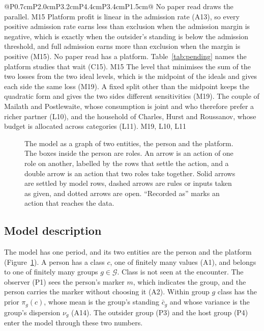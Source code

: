 \begin{longtable}{@{}P{0.7cm}P{2.0cm}P{3.2cm}P{4.4cm}P{3.4cm}P{1.5cm}@{}}
  {No paper read draws the parallel.}
  {M15}
  {Platform profit is linear in the admission rate (A13), so every positive
  admission rate earns less than exclusion when the admission margin is
  negative, which is exactly when the outsider's standing is below the
  admission threshold, and full admission earns more than exclusion when the
  margin is positive (M15).}
  {No paper read has a platform. Table~\ref{tab:pending} names the
  platform studies that wait (C15).}
  {M15}
  {The level that minimises the sum of the two losses from the two ideal
  levels, which is the midpoint of the ideals and gives each side the same
  loss (M19). A fixed split other than the midpoint keeps the quadratic
  form and gives the two sides different sensitivities (M19).}
  {The couple of Mailath and Postlewaite, whose consumption is joint and who
  therefore prefer a richer partner (L10), and the household of Charles,
  Hurst and Roussanov, whose budget is allocated across categories (L11).}
  {M19, L10, L11}
\end{longtable}
\normalsize

\begin{landscape}
\begin{figure}[p]
\centering
{}
\caption{The model as a graph of two entities, the person and the platform.
The boxes inside the person are roles. An arrow is an action of one role on
another, labelled by the rows that settle the action, and a double arrow is
an action that two roles take together. Solid arrows are settled by model
rows, dashed arrows are rules or inputs taken as given, and dotted arrows
are open. ``Recorded as'' marks an action that reaches the data.}
\label{fig:ledger}
\end{figure}
\end{landscape}


\subsection{Model description}
\label{sec:description}

The model has one period, and its two entities are the person and the
platform (Figure~\ref{fig:ledger}). A person has a class $c$, one of
finitely many values (A1), and belongs to one of finitely many groups
$g\in\mathcal{G}$. Class is not seen at the encounter. The observer (P1)
sees the person's marker $m$, which indicates the group, and the person
carries the marker without choosing it (A2). Within group $g$ class has the
prior $\pi_g(c)$, whose mean is the group's standing $\bar c_g$ and whose
variance is the group's dispersion $\nu_g$ (A14). The outsider group (P3)
and the host group (P4) enter the model through these two numbers.

